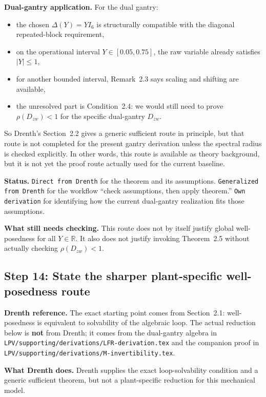 ﻿\documentclass[11pt]{article}
\newcommand{\R}{\mathbb{R}}
\newcommand{\audititem}[2]{\par\smallskip\noindent\textbf{#1.} #2\par}
\newcommand{\statusline}[1]{\texttt{#1}}
\begin{document}
\audititem{Dual-gantry application}{For the dual gantry:
\begin{itemize}[leftmargin=1.2em]
    \item the chosen $\Delta(Y)=YI_6$ is structurally compatible with the
    diagonal repeated-block requirement,
    \item on the operational interval $Y \in [0.05,0.75]$, the raw variable
    already satisfies $|Y| \leq 1$,
    \item for another bounded interval, Remark~2.3 says scaling and shifting are
    available,
    \item the unresolved part is Condition~2.4: we would still need to prove
    $\rho(D_{zw}) < 1$ for the specific dual-gantry $D_{zw}$.
\end{itemize}
So Drenth's Section~2.2 gives a generic sufficient route in principle, but that
route is not completed for the present gantry derivation unless the spectral
radius is checked explicitly. In other words, this route is available as theory
background, but it is not yet the proof route actually used for the current
baseline.}

\audititem{Status}{\statusline{Direct from Drenth} for the theorem and its
assumptions. \statusline{Generalized from Drenth} for the workflow
``check assumptions, then apply theorem.'' \statusline{Own derivation} for
identifying how the current dual-gantry realization fits those assumptions.}

\audititem{What still needs checking}{This route does not by itself justify
global well-posedness for all $Y \in \R$. It also does not justify invoking
Theorem~2.5 without actually checking $\rho(D_{zw}) < 1$.}

\subsection{Step 14: State the sharper plant-specific well-posedness route}

\audititem{Drenth reference}{The exact starting point comes from Section~2.1:
well-posedness is equivalent to solvability of the algebraic loop. The actual
reduction below is \textbf{not} from Drenth; it comes from the dual-gantry
algebra in \texttt{LPV/supporting/derivations/LFR-derivation.tex} and the companion proof in
\texttt{LPV/supporting/derivations/M-invertibility.tex}.}

\audititem{What Drenth does}{Drenth supplies the exact loop-solvability
condition and a generic sufficient theorem, but not a plant-specific reduction
for this mechanical model.}
\end{document}
